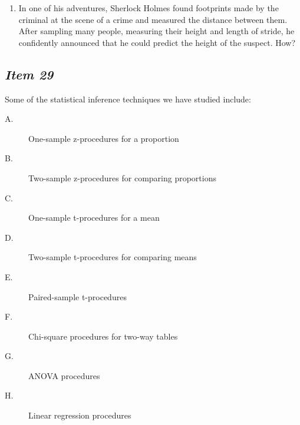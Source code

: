 \begin{enumerate}[leftmargin=1cm, itemsep=.2em]
\bigskip	
\item In one of his adventures, Sherlock Holmes found footprints made by the criminal at the scene of a crime and measured the distance between them. After sampling many people, measuring their height and length of stride, he confidently announced that he could predict the height of the suspect. How?
\end{enumerate}


\subsection{\textbf{\textit{Item 29}}}
Some of the statistical inference techniques we have studied include:
\begin{description}
\item[A.]	One-sample z-procedures for a proportion
\item[B.]	Two-sample z-procedures for comparing proportions
\item[C.] 	One-sample t-procedures for a mean
\item[D.]	Two-sample t-procedures for comparing means
\item[E.]	Paired-sample t-procedures
\item[F.] 	Chi-square procedures for two-way tables
\item[G.]	ANOVA procedures
\item[H.]	Linear regression procedures
\end{description}

